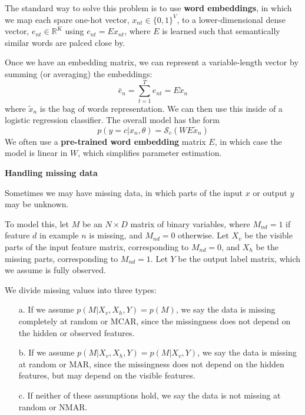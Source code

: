 \par
The standard way to solve this problem is to use \textbf{word embeddings}, in which we map each spare one-hot vector, $x_{nt} \in \{0,1\}^V$, to a lower-dimensional dense vector, $e_{nt}\in \mathbb{R}^K$ using $e_{nt} = Ex_{nt}$, where $E$ is learned such that semantically similar words are palced close by.
\par
Once we have an embedding matrix, we can represent a variable-length vector by summing (or averaging) the embeddings:
\begin{equation}
\bar{e}_n = \sum_{t=1}^Te_{nt} = E\widetilde{x}_n
\end{equation}
where $\widetilde{x}_n$ is the bag of words representation. We can then use this inside of a logistic regression classifier. The overall model has the form
\begin{equation}
p(y=c|x_n,\theta) = \mathcal{S}_c(WE\widetilde{x}_n)
\end{equation}
We often use a \textbf{pre-trained word embedding} matrix $E$, in which case the model is linear in $W$, which simplifies parameter estimation.
~\\
\par
\noindent
\textbf{Handling missing data}
\par
Sometimes we may have missing data, in which parts of the input $x$ or output $y$ may be unknown.
\par
To model this, let $M$ be an $N\times D$ matrix of binary variables, where $M_{nd} = 1$ if feature $d$ in example $n$ is missing, and $M_{nd} = 0$ otherwise. Let $X_v$ be the visible parts of the input feature matrix, corresponding to $M_{nd} = 0$, and $X_h$ be the missing parts, corresponding to $M_{nd}=1$. Let $Y$ be the output label matrix, which we assume is fully observed.
\par
\noindent
We divide missing values into three types:
\begin{itemize}
\item [a.] If we assume $p(M|X_v,X_h,Y) = p(M)$, we say the data is missing completely at random or MCAR, since the missingness does not depend on the hidden or observed features.
\item [b.] If we assume $p(M|X_v,X_h,Y) = p(M|X_v,Y)$, we say the data is missing at random or MAR, since the missingness does not depend on the hidden features, but may depend on the visible features.
\item [c.] If neither of these assumptions hold, we say the data is not missing at random or NMAR.
\end{itemize}
